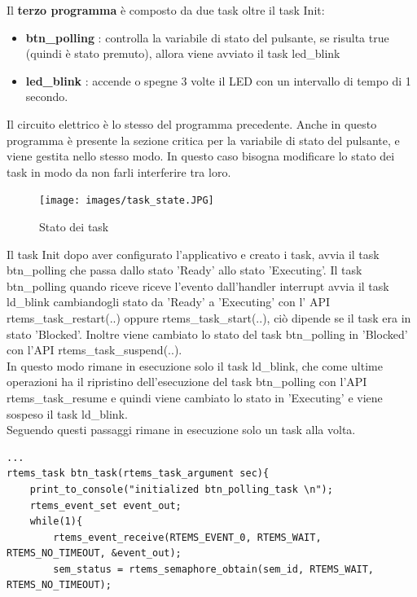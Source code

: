 \documentclass[12pt, a4paper, titlepage, oneside]{book}
\begin{document}
\begin{flushleft}
\newpage
Il \textbf{terzo programma} è composto da due task oltre il task Init:
\begin{itemize}
    \item \textbf{btn\_polling} : controlla la variabile di stato del pulsante, se risulta true (quindi è stato  premuto), allora viene avviato il task led\_blink
    \item \textbf{led\_blink} : accende o spegne 3 volte il LED con un intervallo di tempo di 1 secondo.
\end{itemize}
Il circuito elettrico è lo stesso del programma precedente.
Anche in questo programma è presente la sezione critica per la variabile di stato del pulsante, e viene gestita nello stesso modo.
In questo caso bisogna modificare lo stato dei task in modo da non farli interferire tra loro.\\
\begin{figure}[h]
    \centering
    \texttt{[image: images/task\_state.JPG]}
    \caption{Stato dei task}
    \label{fig:Stato dei task}
\end{figure}
Il task Init dopo aver configurato l'applicativo e creato i task, avvia il task btn\_polling che passa dallo stato 'Ready' allo stato 'Executing'.
Il task btn\_polling quando riceve riceve l'evento dall'handler interrupt avvia il task ld\_blink cambiandogli stato da 'Ready' a 'Executing' con l' API rtems\_task\_restart(..) oppure rtems\_task\_start(..), ciò dipende se il task era in stato 'Blocked'. Inoltre viene cambiato lo stato del task btn\_polling in 'Blocked' con l'API rtems\_task\_suspend(..).\\
In questo modo rimane in esecuzione solo il task ld\_blink, che come ultime operazioni ha il  ripristino dell'esecuzione del task btn\_polling con l'API rtems\_task\_resume e quindi viene cambiato lo stato in 'Executing' e viene sospeso il task ld\_blink.\\
Seguendo questi passaggi rimane in esecuzione solo un task alla volta.
\newpage
\begin{lstlisting}[style = CStyle]
...
rtems_task btn_task(rtems_task_argument sec){
	print_to_console("initialized btn_polling_task \n");
	rtems_event_set event_out;
	while(1){
		rtems_event_receive(RTEMS_EVENT_0, RTEMS_WAIT, RTEMS_NO_TIMEOUT, &event_out);
		sem_status = rtems_semaphore_obtain(sem_id, RTEMS_WAIT, RTEMS_NO_TIMEOUT);

\end{lstlisting}
\end{flushleft}
\end{document}

